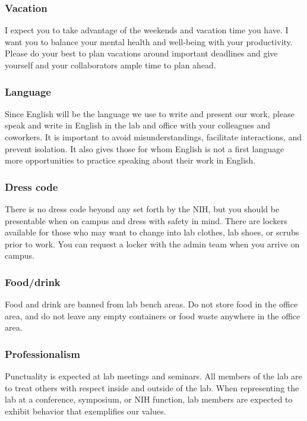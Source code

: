 \documentclass[10pt, letterpaper, twocolumn]{article} %
\begin{document}
\subsubsection{Vacation} I expect you to take advantage of the weekends and vacation time you have. I want you to balance your mental health and well-being with your productivity. Please do your best to plan vacations around important deadlines and give yourself and your collaborators ample time to plan ahead.

\subsubsection{Language}
Since English will be the language we use to write and present our work, please speak and write in English in the lab and office with your colleagues and coworkers. It is important to avoid misunderstandings, facilitate interactions, and prevent isolation. It also gives those for whom English is not a first language more opportunities to practice speaking about their work in English.

\subsubsection{Dress code} There is no dress code beyond any set forth by the NIH, but you should be presentable when on campus and dress with safety in mind. There are lockers available for those who may want to change into lab clothes, lab shoes, or scrubs prior to work. You can request a locker with the admin team when you arrive on campus.

\subsubsection{Food/drink} Food and drink are banned from lab bench areas. Do not store food in the office area, and do not leave any empty containers or food waste anywhere in the office area.

\subsubsection{Professionalism}
Punctuality is expected at lab meetings and seminars. All members of the lab are to treat others with respect inside and outside of the lab. When representing the lab at a conference, symposium, or NIH function, lab members are expected to exhibit behavior that exemplifies our values.
\end{document}
